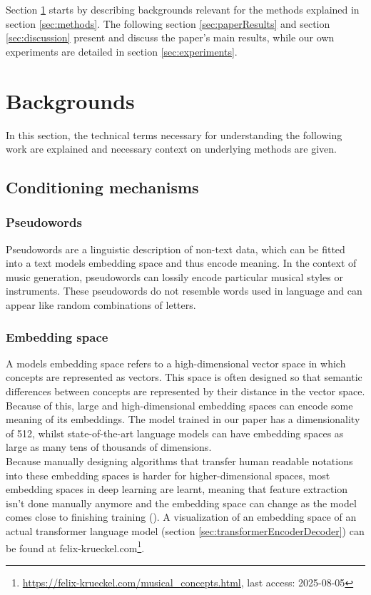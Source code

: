 \documentclass[a4paper,12pt,twoside]{article}
\begin{document}
Section \ref{sec:backgrounds} starts by describing backgrounds relevant for the methods explained in section \ref{sec:methods}.
The following section \ref{sec:paperResults} and section \ref{sec:discussion} present and discuss the paper's main results, while our own experiments are detailed in section \ref{sec:experiments}.

\section{Backgrounds}\label{sec:backgrounds}

In this section, the technical terms necessary for understanding the following work are explained and necessary context on underlying methods are given.

\subsection{Conditioning mechanisms}

\subsubsection*{Pseudowords}\label{sec:pseudowords}

Pseudowords are a linguistic description of non-text data, which can be fitted into a text models embedding space and thus encode meaning. In the context of music generation, pseudowords can lossily encode particular musical styles or instruments. These pseudowords do not resemble words used in language and can appear like random combinations of letters.

\subsubsection*{Embedding space}\label{sec:embeddingSpace}

A models embedding space refers to a high-dimensional vector space in which concepts are represented as vectors. This space is often designed so that semantic differences between concepts are represented by their distance in the vector space. Because of this, large and high-dimensional embedding spaces can encode some meaning of its embeddings. The model trained in our paper has a dimensionality of 512, whilst state-of-the-art language models can have embedding spaces as large as many tens of thousands of dimensions. \\

Because manually designing algorithms that transfer human readable notations into these embedding spaces is harder for higher-dimensional spaces, most embedding spaces in deep learning are learnt, meaning that feature extraction isn't done manually anymore and the embedding space can change as the model comes close to finishing training (\cite{lecunDeepLearning2015}). A visualization of an embedding space of an actual transformer language model  (section \ref{sec:transformerEncoderDecoder}) can be found at felix-krueckel.com\footnote{\url{https://felix-krueckel.com/musical\_concepts.html}, last access: 2025-08-05}.
\end{document}
